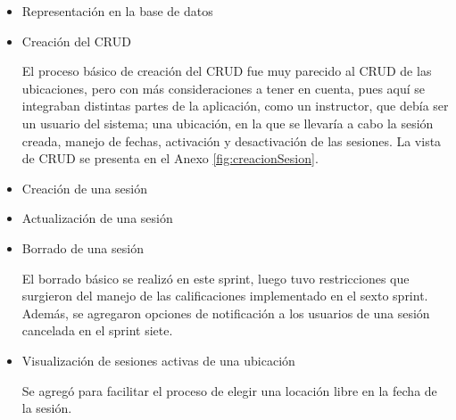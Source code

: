 \begin{itemize}


\item Representación en la base de datos

\item Creación del \gls{CRUD}

El proceso básico de creación del \gls{CRUD} fue muy parecido al \gls{CRUD} de las ubicaciones, pero con más consideraciones a tener en cuenta, pues aquí se integraban distintas partes de la aplicación, como un instructor, que debía ser un usuario del sistema; una ubicación, en la que se llevaría a cabo la sesión creada, manejo de fechas, activación y desactivación de las sesiones. La vista de \gls{CRUD} se presenta en el Anexo \ref{fig:creacionSesion}.

\item Creación de una sesión

\item Actualización de una sesión

\item Borrado de una sesión

El borrado básico se realizó en este sprint, luego tuvo restricciones que surgieron del manejo de las calificaciones implementado en el sexto sprint. Además, se agregaron opciones de notificación a los usuarios de una sesión cancelada en el sprint siete. 

\item Visualización de sesiones activas de una ubicación

Se agregó para facilitar el proceso de elegir una locación libre en la fecha de la sesión.

\end{itemize}


